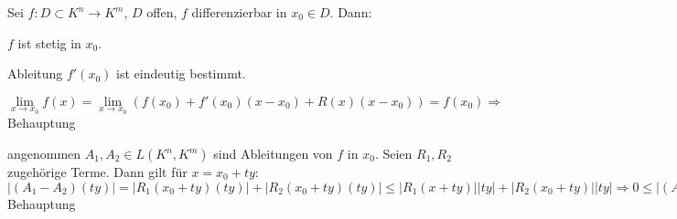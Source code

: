 	\begin{satz}
		Sei $f:D\subset K^n \to K^m$, $D$ offen, $f$ differenzierbar in $x_0\in D$. Dann:
		\begin{compactitem}
			\item $f$ ist stetig in $x_0$.
			\item Ableitung $f'(x_0)$ ist eindeutig bestimmt.
		\end{compactitem}
	\end{satz}
	\begin{beweis}
		\begin{compactitem}
			\item $\lim\limits_{x\to x_0} f(x)=\lim\limits_{x\to x_0} (f(x_0)+f'(x_0)(x-x_0)+R(x)(x-x_0))=f(x_0)
			\Rightarrow$ Behauptung
			\item angenommen $A_1,A_2\in L(K^n,K^m)$ sind Ableitungen von $f$ in $x_0$. Seien $R_1,R_2$ 
			zugehörige Terme. Dann gilt für $x=x_0+ty$: $|(A_1-A_2)(ty)|=|R_1(x_0+ty)(ty)|+|R_2(x_0+ty)
			(ty)| \le |R_1(x+ty)||ty|+|R_2(x_0+ty)||ty|\Rightarrow 0\le |(A_1-A_2)(y)|\le (|R_1(x_0+ty)|+|R_2
			(x_0+ty)|)|y|\to 0\Rightarrow (A_1-A_2)(y)=0\Rightarrow A_1=A_2\Rightarrow$ Behauptung
		\end{compactitem}
	\end{beweis}

